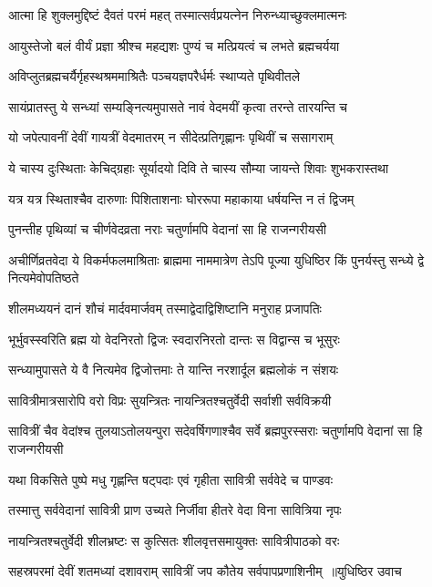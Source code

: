 \twolineshloka
{आत्मा हि शुक्लमुद्दिष्टं दैवतं परमं महत्}
{तस्मात्सर्वप्रयत्नेन निरुन्ध्याच्छुक्लमात्मनः}


\twolineshloka
{आयुस्तेजो बलं वीर्यं प्रज्ञा श्रीश्च महद्यशः}
{पुण्यं च मत्प्रियत्वं च लभते ब्रह्मचर्यया}


\twolineshloka
{अविप्लुतब्रह्मचर्यैर्गृहस्थश्रममाश्रितैः}
{पञ्चयज्ञपरैर्धर्मः स्थाप्यते पृथिवीतले}


\twolineshloka
{सायंप्रातस्तु ये सन्ध्यां सम्यङ्नित्यमुपासते}
{नावं वेदमयीं कृत्वा तरन्ते तारयन्ति च}


\twolineshloka
{यो जपेत्पावनीं देवीं गायत्रीं वेदमातरम्}
{न सीदेत्प्रतिगृह्णानः पृथिवीं च ससागराम्}


\twolineshloka
{ये चास्य दुःस्थिताः केचिद्ग्रहाः सूर्यादयो दिवि}
{ते चास्य सौम्या जायन्ते शिवाः शुभकरास्तथा}


\twolineshloka
{यत्र यत्र स्थिताश्चैव दारुणाः पिशिताशनाः}
{घोररूपा महाकाया धर्षयन्ति न तं द्विजम्}


\twolineshloka
{पुनन्तीह पृथिव्यां च चीर्णवेदव्रता नराः}
{चतुर्णामपि वेदानां सा हि राजन्गरीयसी}


\threelineshloka
{अचीर्णिव्रतवेदा ये विकर्मफलमाश्रिताः}
{ब्राह्ममा नाममात्रेण तेऽपि पूज्या युधिष्ठिर}
{किं पुनर्यस्तु सन्ध्ये द्वे नित्यमेवोपतिष्ठते}


\twolineshloka
{शीलमध्ययनं दानं शौचं मार्दवमार्जवम्}
{तस्माद्वेदाद्विशिष्टानि मनुराह प्रजापतिः}


\twolineshloka
{भूर्भुवस्स्वरिति ब्रह्म यो वेदनिरतो द्विजः}
{स्वदारनिरतो दान्तः स विद्वान्स च भूसुरः}


\twolineshloka
{सन्ध्यामुपासते ये वै नित्यमेव द्विजोत्तमाः}
{ते यान्ति नरशार्दूल ब्रह्मलोकं न संशयः}


\twolineshloka
{सावित्रीमात्रसारोपि वरो विप्रः सुयन्त्रितः}
{नायन्त्रितश्चतुर्वेदी सर्वाशी सर्वविक्रयी}


\threelineshloka
{सावित्रीं चैव वेदांश्च तुलयाऽतोलयन्पुरा}
{सदेवर्षिगणाश्चैव सर्वे ब्रह्मपुरस्सराः}
{चतुर्णामपि वेदानां सा हि राजन्गरीयसी}


\twolineshloka
{यथा विकसिते पुष्पे मधु गृह्णन्ति षट्पदाः}
{एवं गृहीता सावित्री सर्ववेदे च पाण्डवः}


\twolineshloka
{तस्मात्तु सर्ववेदानां सावित्री प्राण उच्यते}
{निर्जीवा हीतरे वेदा विना सावित्रिया नृपः}


\twolineshloka
{नायन्त्रितश्चतुर्वेदी शीलभ्रष्टः स कुत्सितः}
{शीलवृत्तसमायुक्तः सावित्रीपाठको वरः}


\threelineshloka
{सहस्रपरमां देवीं शतमध्यां दशावराम्}
{सावित्रीं जप कौतेय सर्वपापप्रणाशिनीम् ॥युधिष्ठिर उवाच}
{}


